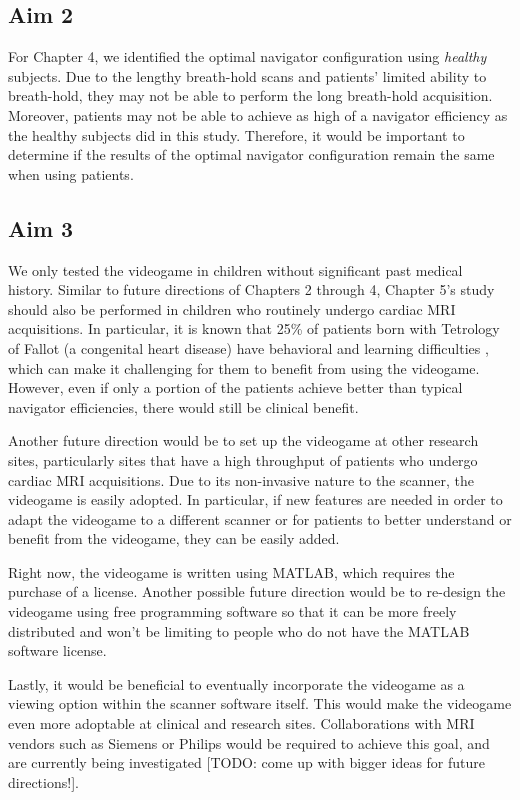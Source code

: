 \subsection{Aim 2}
	For Chapter 4, we identified the optimal navigator configuration using \textit{healthy} subjects. Due to the lengthy breath-hold scans and patients' limited ability to breath-hold, they may not be able to perform the long breath-hold acquisition. Moreover, patients may not be able to achieve as high of a navigator efficiency as the healthy subjects did in this study. Therefore, it would be important to determine if the results of the optimal navigator configuration remain the same when using patients.

\subsection{Aim 3}
	We only tested the videogame in children without significant past medical history. Similar to future directions of Chapters 2 through 4, Chapter 5's study should also be performed in children who routinely undergo cardiac MRI acquisitions. In particular, it is known that 25\% of patients born with Tetrology of Fallot (a congenital heart disease) have behavioral and learning difficulties \cite{Piran2011}, which can make it challenging for them to benefit from using the videogame. However, even if only a portion of the patients achieve better than typical navigator efficiencies, there would still be clinical benefit.
	
	Another future direction would be to set up the videogame at other research sites, particularly sites that have a high throughput of patients who undergo cardiac MRI acquisitions. Due to its non-invasive nature to the scanner, the videogame is easily adopted. In particular, if new features are needed in order to adapt the videogame to a different scanner or for patients to better understand or benefit from the videogame, they can be easily added.
	
	Right now, the videogame is written using MATLAB, which requires the purchase of a license. Another possible future direction would be to re-design the videogame using free programming software so that it can be more freely distributed and won't be limiting to people who do not have the MATLAB software license. 
	
	Lastly, it would be beneficial to eventually incorporate the videogame as a viewing option within the scanner software itself. This would make the videogame even more adoptable at clinical and research sites. Collaborations with MRI vendors such as Siemens or Philips would be required to achieve this goal, and are currently being investigated [TODO: come up with bigger ideas for future directions!].
	
	